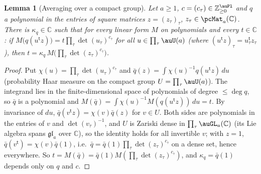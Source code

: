 \documentclass[10pt]{amsart}
\newtheorem{lemma}[theorem]{Lemma}
\theoremstyle{definition}
\theoremstyle{remark}
\newcommand{\C}{\mathbb C}
\newcommand{\Z}{\mathbb Z}
\begin{document}
\begin{lemma}[Averaging over a compact group]\label{pte:average}
Let $a\ge1$, $c=(c_\tau)\in\Z_{\ge0}^{\auPl}$ and $q$ a polynomial in the entries of square matrices
$z=(z_\tau)_\tau$, $z_\tau\in\pcMat_a(\C)$. There is $\kappa_q\in\C$ such that for every linear form
$M$ on polynomials and every $t\in\C$: if $M\bigl(q(u^{\mathsf t}z)\bigr)=t\prod_\tau\det(u_\tau)^{c_\tau}$
for all $u\in\prod_\tau\auU(a)$ (where $(u^{\mathsf t}z)_\tau=u_\tau^{\mathsf t}z_\tau$), then
$t=\kappa_q\,M\bigl(\prod_\tau\det(z_\tau)^{c_\tau}\bigr)$.
\end{lemma}
\begin{proof}
Put $\chi(u)=\prod_\tau\det(u_\tau)^{c_\tau}$ and $\bar q(z)=\int\chi(u)^{-1}q(u^{\mathsf t}z)\,du$
(probability Haar measure on the compact group $U=\prod_\tau\auU(a)$). The integrand lies in the
finite-dimensional space of polynomials of degree $\le\deg q$, so $\bar q$ is a polynomial and
$M(\bar q)=\int\chi(u)^{-1}M(q(u^{\mathsf t}z))\,du=t$. By invariance of $du$, $\bar q(v^{\mathsf t}z)=
\chi(v)\bar q(z)$ for $v\in U$. Both sides are polynomials in the entries of $v$ and $\det(v_\tau)^{-1}$, and $U$ is
Zariski dense in $\prod_\tau\auGL_a(\C)$ (its Lie algebra spans $\mathfrak{gl}_a$ over $\C$), so the
identity holds for all invertible $v$; with $z=1$, $\bar q(v^{\mathsf t})=\chi(v)\bar q(1)$, i.e.\ $\bar q=
\bar q(1)\prod_\tau\det(z_\tau)^{c_\tau}$ on a dense set, hence everywhere. So $t=M(\bar q)=\bar q(1)
M(\prod_\tau\det(z_\tau)^{c_\tau})$, and $\kappa_q=\bar q(1)$ depends only on $q$ and $c$.
\end{proof}
\end{document}

